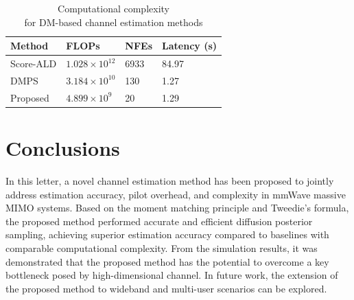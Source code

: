 \documentclass[lettersize,journal]{IEEEtran}
\begin{document}
\begin{table}[!t]
\centering
\renewcommand{\arraystretch}{1.1} 
\caption{Computational complexity \\for DM-based channel estimation methods}
\label{tab:table1}
\begin{tabular}{M{0.20\columnwidth}|M{0.21\columnwidth}|M{0.20\columnwidth}|M{0.20\columnwidth}}
\hline
\textbf{Method} & \textbf{FLOPs} & \textbf{NFEs} & \textbf{Latency (s)} \\
\hline
Score-ALD\cite{arvinteMIMOChannelEstimation2023} & \(1.028 \times 10^{12}\) & 6933 & 84.97 \\
\hline
DMPS\cite{zhouGenerativeDiffusionModels2025} & \(3.184 \times 10^{10}\) & 130 & 1.27 \\
\hline
Proposed & \(4.899 \times 10^9\) & 20 & 1.29 \\
\hline
\end{tabular}
\end{table}

\section{Conclusions}

In this letter, a novel channel estimation method has been proposed to jointly address estimation accuracy, pilot overhead, and complexity in mmWave massive MIMO systems. Based on the moment matching principle and Tweedie's formula, the proposed method performed accurate and efficient diffusion posterior sampling, achieving superior estimation accuracy compared to baselines with comparable computational complexity. From the simulation results, it was demonstrated that the proposed method has the potential to overcome a key bottleneck posed by high-dimensional channel. In future work, the extension of the proposed method to wideband and multi-user scenarios can be explored.


% 

\end{document}
